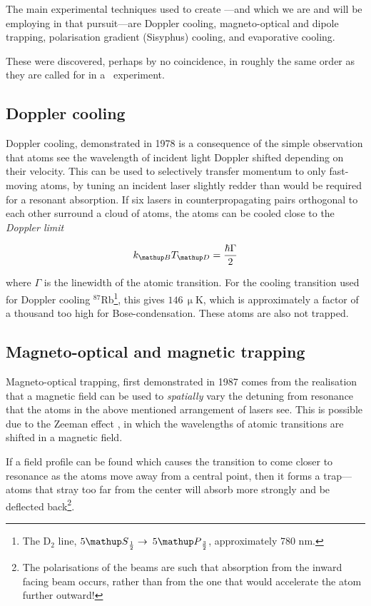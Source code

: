 The main experimental techniques used to create \bec---and which we are and will be employing in that pursuit---are Doppler cooling, magneto-optical and dipole trapping, polarisation gradient (Sisyphus) cooling, and evaporative cooling.

These were discovered, perhaps by no coincidence, in roughly the same order as they are called for in a \bec\ experiment.

\subsection{Doppler cooling}

Doppler cooling, demonstrated in 1978 \cite{wineland_radiation-pressure_1978} is a consequence of the simple observation that atoms see the wavelength of incident light Doppler shifted depending on their velocity. This can be used to selectively transfer momentum to only fast-moving atoms, by tuning an incident laser slightly redder than would be required for a resonant absorption. If six lasers in counterpropagating pairs orthogonal to each other surround a cloud of atoms, the atoms can be cooled close to the \emph{Doppler limit} \cite[p 58]{metcalf_laser_1999}

\begin{equation}
k_\up{B} T_\up{D} = \frac{\hbar\Gamma}2
\end{equation}

where $\Gamma$ is the linewidth of the atomic transition. For the cooling transition used for Doppler cooling $^{87}$Rb\footnote{The D$_2$ line, $5\up{S}_{\frac12}\rightarrow$ $5\up{P}_{\frac32}$, approximately 780 nm.}, this gives $146\,\upmu$K, which is approximately a factor of a thousand too high for Bose-condensation. These atoms are also not trapped.

\subsection{Magneto-optical and magnetic trapping}

Magneto-optical trapping, first demonstrated in 1987 \cite{raab_trapping_1987} comes from the realisation that a magnetic field can be used to \emph{spatially} vary the detuning from resonance that the atoms in the above mentioned arrangement of lasers see. This is possible due to the Zeeman effect \cite{zeeman_influence_1897}, in which the wavelengths of atomic transitions are shifted in a magnetic field.

If a field profile can be found which causes the transition to come closer to resonance as the atoms move away from a central point, then it forms a trap---atoms  that stray too far from the center will absorb more strongly and be deflected back\footnote{The polarisations of the beams are such that absorption from the inward facing beam occurs, rather than from the one that would accelerate the atom further outward!}.

